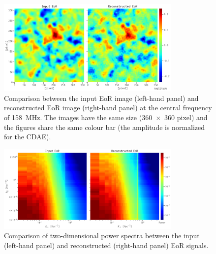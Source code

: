 \documentclass[fleqn,usenatbib]{mnras}
\begin{document}
\begin{figure}
  \centering
  \includegraphics[width=0.8\textwidth]{eor-img-comp}
  \caption{\label{fig:eor-img}%
    Comparison between the input EoR image (left-hand panel) and
    reconstructed EoR image (right-hand panel) at the central frequency of
    \SI{158}{\MHz}.
    The images have the same size (\num{360 x 360} pixel) and the figures
    share the same colour bar (the amplitude is normalized for the CDAE).
  }
\end{figure}

\begin{figure}
  \centering
  \includegraphics[width=0.8\textwidth]{eor-ps-comp}
  \caption{\label{fig:eor-ps}%
    Comparison of two-dimensional power spectra between the input
    (left-hand panel) and reconstructed (right-hand panel) EoR signals.
  }
\end{figure}
\end{document}
